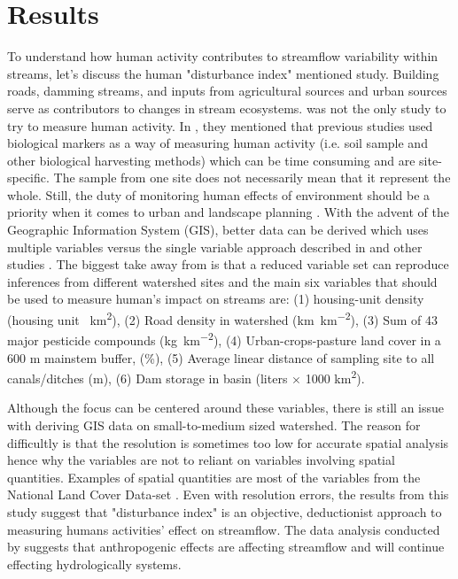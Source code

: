 \documentclass[a4paper,man,biblatex]{apa7}
\begin{document}
\section{Results}
\par To understand how human activity contributes to streamflow variability within streams, let's discuss the human "disturbance index" mentioned \textcite{falcone_2016} study. Building roads, damming streams, and inputs from agricultural sources and urban sources serve as contributors to changes in stream ecosystems. \textcite{falcone_2016} was not the only study to try to measure human activity. In \textcite{stein_2002}, they mentioned that previous studies used biological markers as a way of measuring human activity (i.e. soil sample and other biological harvesting methods) which can be time consuming and are site-specific. The sample from one site does not necessarily mean that it represent the whole. Still, the duty of monitoring human effects of environment should be a priority when it comes to urban and landscape planning \autocite{stein_2002}. With the advent of the Geographic Information System (GIS), better data can be derived which uses multiple variables versus the single variable approach described in \textcite{stein_2002} and other studies \autocite{falcone_2016}. The biggest take away from \textcite{falcone_2016} is that a reduced variable set can reproduce inferences from different watershed sites and the main six variables that should be used to measure human's impact on streams are: (1) housing-unit density (housing unit \si{\per\square\kilo\meter}), (2) Road density in watershed (\si{\kilo\meter\per\square\kilo\meter}), (3) Sum of 43 major pesticide compounds (\si{\kilo\gram\per\square\kilo\meter}), (4) Urban-crops-pasture land cover in a 600 m mainstem buffer, (\%), (5) Average linear distance of sampling site to all canals/ditches (m), (6) Dam storage in basin (liters $\times$ 1000 \si{\square\kilo\meter}). 
\par Although the focus can be centered around these variables, there is still an issue with deriving GIS data on small-to-medium sized watershed. The reason for difficultly is that the resolution is sometimes too low for accurate spatial analysis hence why the variables are not to reliant on variables involving spatial quantities. Examples of spatial quantities are most of the variables from the National Land Cover Data-set \autocite{falcone_2016}. Even with resolution errors, the results from this study suggest that "disturbance index" is an objective, deductionist approach to measuring humans activities' effect on streamflow. The data analysis conducted by \textcite{mallakpour_2018} suggests that anthropogenic effects are affecting streamflow  and will continue effecting hydrologically systems.\\
\end{document}
